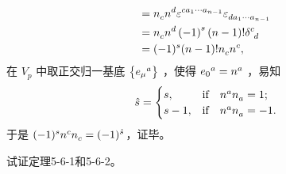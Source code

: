 \begin{xiti}
\begin{zm}
\begin{align*}
		=&\; \tensor{n}{_c} \tensor{n}{^d} \tensor{\varepsilon}{^{c a_1 \cdots a_{n-1}}} \tensor{\varepsilon}{_{d a_1 \cdots a_{n-1}}}\\
		=&\; \tensor{n}{_c} \tensor{n}{^d} \left(-1\right)^s \left(n-1\right)! \tensor{\delta}{^c_d}\\
		=& \; (-1)^s (n-1)! \tensor{n}{_c} \tensor{n}{^c},
		\end{align*}
		在 $V_p$ 中取正交归一基底 $\left\{\tensor{{e_\mu}}{^a}\right\}$ ，使得 $\tensor{{e_0}}{^a}=\tensor{n}{^a}$ ，易知
		\begin{displaymath}
		\hat{s}=\begin{cases}
		s, &\qif* \tensor{n}{^a}\tensor{n}{_a}=1;\\
		s-1, &\qif* \tensor{n}{^a}\tensor{n}{_a}=-1.
		\end{cases}
		\end{displaymath}
		于是 $(-1)^s \tensor{n}{^c} \tensor{n}{_c} = (-1)^{\hat{s}} $，证毕。
	\end{zm}

	\item 试证定理5-6-1和5-6-2。


\end{xiti}

